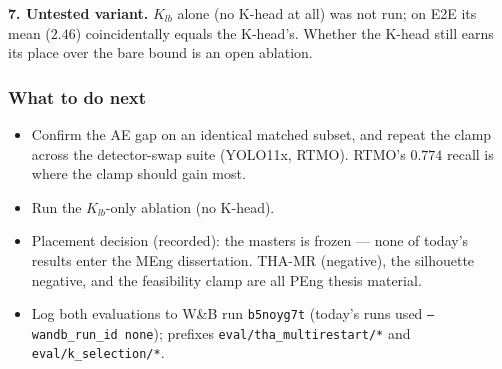 \textbf{7. Untested variant.} $K_{lb}$ alone (no K-head at all) was not run; on E2E its mean ($2.46$) coincidentally equals the K-head's. Whether the K-head still earns its place over the bare bound is an open ablation.

\subsubsection{What to do next}

\begin{itemize}
    \item Confirm the AE gap on an identical matched subset, and repeat the clamp across the detector-swap suite (YOLO11x, RTMO). RTMO's $0.774$ recall is where the clamp should gain most.
    \item Run the $K_{lb}$-only ablation (no K-head).
    \item Placement decision (recorded): the masters is frozen --- none of today's results enter the MEng dissertation. THA-MR (negative), the silhouette negative, and the feasibility clamp are all PEng thesis material.
    \item Log both evaluations to W\&B run \texttt{b5noyg7t} (today's runs used \texttt{--wandb\_run\_id none}); prefixes \texttt{eval/tha\_multirestart/*} and \texttt{eval/k\_selection/*}.
\end{itemize}
